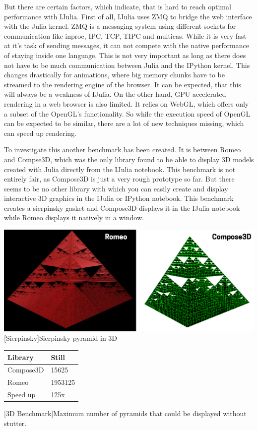 But there are certain factors, which indicate, that is hard to reach optimal performance with IJulia.
First of all, IJulia uses ZMQ to bridge the web interface with the Julia kernel.
ZMQ is a messaging system using different sockets for communication like inproc, IPC, TCP, TIPC and multicas.
While it is very fast at it's task of sending messages, it can not compete with the native performance of staying inside one language.
This is not very important as long as there does not have to be much communication between Julia and the IPython kernel. This changes drastically for animations, where big memory chunks have to be streamed to the rendering engine of the browser. It can be expected, that this will always be a weakness of IJulia.
On the other hand, GPU accelerated rendering in a web browser is also limited.
It relies on WebGL, which offers only a subset of the OpenGL's functionality. So while the execution speed of OpenGL can be expected to be similar, there are a lot of new techniques missing, which can speed up rendering.

To investigate this another benchmark has been created.
It is between Romeo and Compse3D, which was the only library found to be able to display 3D models created with Julia directly from the IJulia notebook.
This benchmark is not entirely fair, as Compose3D is just a very rough prototype so far. 
But there seems to be no other library with which you can easily create and display interactive 3D graphics in the IJulia or IPython notebook. 
This benchmark creates a sierpinsky gasket and Compose3D displays it in the IJulia notebook while Romeo displays it natively in a window.

\begin{minipage}{\linewidth}
    \centering
    \includegraphics[width=\linewidth]{graphics/sierpinsky.jpg}
    [Sierpinsky]{Sierpinsky pyramid in 3D}
    \label{fig:reactive1}
\end{minipage}
\begin{table}[htbp]
    \centering
    \begin{tabular}{l|l}
        \hline
        \textbf{Library} & \textbf{Still}\\ 
        \hline
        Compose3D        & 15625         \\
        Romeo            & 1953125       \\
        \hline
        \hline
        Speed up         & 125x          \\
    \end{tabular}
    [3D Benchmark]{Maximum number of pyramids that could be displayed without stutter.}
    \label{table:relativespeedoglw}
\end{table}

